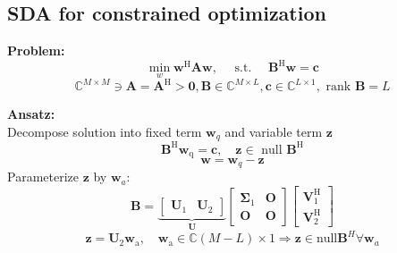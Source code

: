 \documentclass[english]{latex4ei/latex4ei_sheet}
\begin{document}
\begin{sectionbox}
  \subsection{SDA for constrained optimization}
  \textbf{Problem:}\\
  $$\min _{w} \boldsymbol{w}^{\mathrm{H}} \boldsymbol{A} \boldsymbol{w}, \quad \text { s.t. } \quad \boldsymbol{B}^{\mathrm{H}} \boldsymbol{w}=\boldsymbol{c}$$
  $$\mathbb{C}^{M \times M} \ni \boldsymbol{A}=\boldsymbol{A}^{\mathrm{H}}>\mathbf{0}, \boldsymbol{\boldsymbol{B}} \in \mathbb{C}^{M \times L}, \boldsymbol{c} \in \mathbb{C}^{L \times 1}, \text { rank } \boldsymbol{B}=L$$

  \textbf{Ansatz:}\\
  Decompose solution into fixed term $\boldsymbol{w}_{q}$ and variable term $\boldsymbol{z}$\\
  $$\boldsymbol{B}^{\mathrm{H}} \boldsymbol{w}_{\mathrm{q}}=\boldsymbol{c}, \quad \boldsymbol{z} \in \text { null } \boldsymbol{B}^{\mathrm{H}}$$
  $$\boldsymbol{w}=\boldsymbol{w}_{q}-\boldsymbol{z}$$
  Parameterize $\boldsymbol{z}$ by $\boldsymbol{w}_a$:
  $$\boldsymbol{B}=\underbrace{\left[\begin{array}{ll}
    \boldsymbol{U}_{1} & \boldsymbol{U}_{2}
    \end{array}\right]}_{\boldsymbol{U}}\left[\begin{array}{ll}
    \boldsymbol{\Sigma}_{1} & \mathbf{O} \\
    \mathbf{O} & \mathbf{O}
    \end{array}\right]\left[\begin{array}{l}
    \boldsymbol{V}_{1}^{\mathrm{H}} \\
    \boldsymbol{V}_{2}^{\mathrm{H}}
    \end{array}\right]$$
    $$\boldsymbol{z}=\boldsymbol{U}_{2} \boldsymbol{w}_{\mathrm{a}}, \quad \boldsymbol{w}_{\mathrm{a}} \in \mathbb{C}(M-L) \times 1 \Rightarrow \boldsymbol{z} \in \text{null}\boldsymbol{B}^H \forall \boldsymbol{w}_a$$
    

\end{sectionbox}
\end{document}
